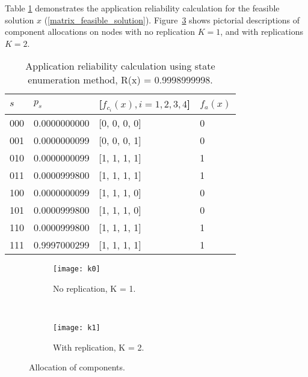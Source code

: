 Table \ref{tbl_application_rel} demonstrates the application reliability calculation for the feasible solution $x$ (\ref{matrix_feasible_solution}). Figure~\ref{fig_comp_replications} shows pictorial descriptions of component allocations on nodes with no replication $K=1$, and with replications $K=2$. 
\begin{table}[h]
\centering
\begin{tabular}{@{}llll@{}}
\toprule
$s$   & $p_s$     & {[}$f_{c_i}(x), i=1,2,3,4${]} & $f_a(x)$ \\ \midrule
000 & 0.0000000000 & {[}0, 0, 0, 0{]}          & 0     \\
001 & 0.0000000099 & {[}0, 0, 0, 1{]}          & 0     \\
010 & 0.0000000099 & {[}1, 1, 1, 1{]}          & 1     \\
011 & 0.0000999800 & {[}1, 1, 1, 1{]}          & 1     \\
100 & 0.0000000099 & {[}1, 1, 1, 0{]}          & 0     \\
101 & 0.0000999800 & {[}1, 1, 1, 0{]}          & 0     \\
110 & 0.0000999800 & {[}1, 1, 1, 1{]}          & 1     \\
111 & 0.9997000299 & {[}1, 1, 1, 1{]}          & 1     \\ \bottomrule
\end{tabular}
\caption{Application reliability calculation using state enumeration method, R(x) = 0.9998999998.}
\label{tbl_application_rel}
\end{table}

\begin{figure}
    \centering
    \begin{subfigure}[b]{0.2\textwidth}
        \texttt{[image: k0]}
        \caption{No replication, K = 1.}
        \label{fig:datachainsingle}
    \end{subfigure}
    ~ %
    \begin{subfigure}[b]{0.25\textwidth}
        \texttt{[image: k1]}
        \caption{With replication, K = 2.}
        \label{fig:datachainmulti}
    \end{subfigure}
    \caption{Allocation of components.}
    \label{fig_comp_replications}
\end{figure}

